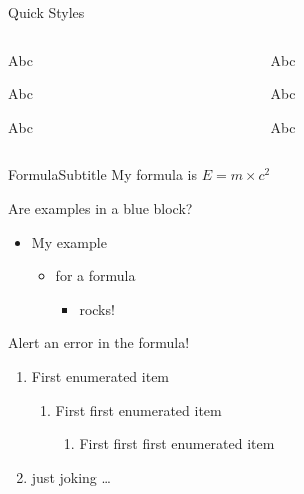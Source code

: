 \documentclass[aspectratio=169,12pt]{beamer}
\begin{document}
\begin{frame}{Quick Styles}
\begin{columns}
    \begin{column}{0.12\paperwidth}
    \begin{yellow0block}{Abc}
    \end{yellow0block}
    \begin{yellow1block}{Abc}
    \end{yellow1block}
    \begin{yellow2block}{Abc}
    \end{yellow2block}
    \end{column}

    \begin{column}{0.12\paperwidth}
    \begin{red0block}{Abc}
    \end{red0block}
    \begin{red1block}{Abc}
    \end{red1block}
    \begin{red2block}{Abc}
    \end{red2block}
    \end{column}

\end{columns}
\end{frame}

\begin{frame}{Formula}{Subtitle}
    My formula is $E=m\times c^2$
    \begin{blue2block}{Are examples in a blue block?}
    \begin{itemize}
        \item My example
        \begin{itemize}
            \item for a formula
            \begin{itemize}
                \item rocks!
            \end{itemize}
        \end{itemize}
    \end{itemize}
    \end{blue2block}

    \begin{red2block}{Alert an error in the formula!}
    \begin{enumerate}
        \item First enumerated item
        \begin{enumerate}
            \item First first enumerated item
            \begin{enumerate}
                \item First first first enumerated item
            \end{enumerate}
        \end{enumerate}
        \item just joking \dots
    \end{enumerate}
    \end{red2block}
\end{frame}
\end{document}
